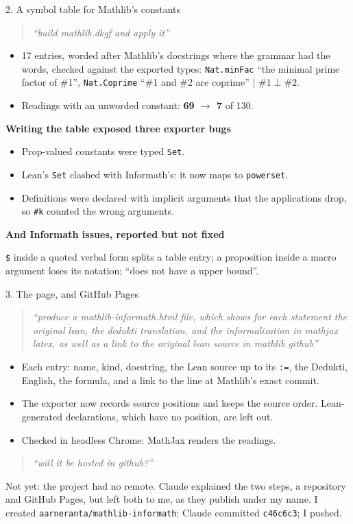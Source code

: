 \documentclass[10pt,aspectratio=169]{beamer}
\newcommand{\bad}[1]{\textcolor{warn}{#1}}
\newcommand{\commit}[1]{\texttt{\footnotesize #1}}
\newcommand{\prompt}[1]{\begin{quote}\small\itshape ``#1''\end{quote}}
\newcommand{\decided}[1]{\par\textcolor{gfblue}{\textbf{#1}}\par}
\begin{document}
\begin{frame}{2. A symbol table for Mathlib's constants}
  \small
  \prompt{build mathlib.dkgf and apply it}
  \begin{itemize}
    \item 17 entries, worded after Mathlib's docstrings where the grammar had
          the words, checked against the exported types:
          \texttt{Nat.minFac} ``the minimal prime factor of \#1'',
          \texttt{Nat.Coprime} ``\#1 and \#2 are coprime'' $|$ $\#1 \perp \#2$.
    \item Readings with an unworded constant: \textbf{69 $\to$ 7} of 130.
  \end{itemize}
  \decided{Writing the table exposed three exporter bugs}
  \begin{itemize}
    \item Prop-valued constants were typed \texttt{Set}.
    \item Lean's \texttt{Set} clashed with Informath's: it now maps to \texttt{powerset}.
    \item Definitions were declared with implicit arguments that the
          applications drop, so \texttt{\#k} counted the wrong arguments.
  \end{itemize}
  \decided{And Informath issues, reported but not fixed}
  \texttt{\$} inside a quoted verbal form splits a table entry; a proposition
  inside a macro argument loses its notation; ``does not have \bad{a} upper bound''.
\end{frame}

\begin{frame}{3. The page, and GitHub Pages}
  \small
  \prompt{produce a mathlib-informath.html file, which shows for each statement
  the original lean, the dedukti translation, and the informalization in mathjax
  latex, as well as a link to the original lean source in mathlib github}
  \begin{itemize}
    \item Each entry: name, kind, docstring, the Lean source up to its
          \texttt{:=}, the Dedukti, English, the formula, and a link to the
          line at Mathlib's exact commit.
    \item The exporter now records source positions and keeps the source
          order. Lean-generated declarations, which have no position, are
          left out.
    \item Checked in headless Chrome: MathJax renders the readings.
  \end{itemize}
  \prompt{will it be hosted in github?}
  Not yet: the project had no remote. Claude explained the two steps,
  a repository and GitHub Pages, but left both to me, as they publish under
  my name. I created \texttt{aarneranta/mathlib-informath}; Claude committed
  \commit{c46c6c3}; I pushed.
\end{frame}
\end{document}
